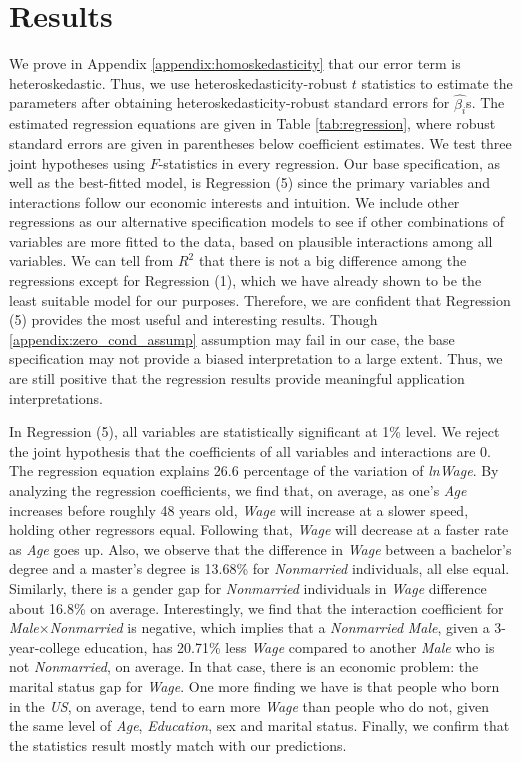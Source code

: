 \section{Results}
\label{sec:results}



We prove in Appendix \ref{appendix:homoskedasticity} that our error term is heteroskedastic. Thus, we use heteroskedasticity-robust $t$ statistics to estimate the parameters after obtaining heteroskedasticity-robust standard errors for $\hat{\beta_{i}}$s. The estimated regression equations are given in Table \ref{tab:regression}, where robust standard errors are given in parentheses below coefficient estimates. We test three joint hypotheses using $F$-statistics in every regression. Our base specification, as well as the best-fitted model, is Regression (5) since the primary variables and interactions follow our economic interests and intuition. We include other regressions as our alternative specification models to see if other combinations of variables are more fitted to the data, based on plausible interactions among all variables. We can tell from $R^2$ that there is not a big difference among the regressions except for Regression (1), which we have already shown to be the least suitable model for our purposes. Therefore, we are confident that Regression (5) provides the most useful and interesting results. Though \ref{appendix:zero_cond_assump} assumption may fail in our case, the base specification may not provide a biased interpretation to a large extent. Thus, we are still positive that the regression results provide meaningful application interpretations.

In Regression (5), all variables are statistically significant at 1\% level. We reject the joint hypothesis that the coefficients of all variables and interactions are 0. The regression equation explains 26.6 percentage of the variation of \textit{lnWage}. By analyzing the regression coefficients, we find that, on average, as one's \textit{Age} increases before roughly 48 years old, \textit{Wage} will increase at a slower speed, holding other regressors equal. Following that, \textit{Wage} will decrease at a faster rate as \textit{Age} goes up. Also, we observe that the difference in \textit{Wage} between a bachelor's degree and a master's degree is 13.68\% for \textit{Nonmarried} individuals, all else equal. Similarly, there is a gender gap for \textit{Nonmarried} individuals in \textit{Wage} difference about 16.8\% on average. Interestingly, we find that the interaction coefficient for \textit{Male$\times$Nonmarried} is negative, which implies that a \textit{Nonmarried} \textit{Male}, given a 3-year-college education, has 20.71\% less \textit{Wage} compared to another \textit{Male} who is not \textit{Nonmarried}, on average. In that case, there is an economic problem: the marital status gap for \textit{Wage}. One more finding we have is that people who born in the \textit{US}, on average, tend to earn more \textit{Wage} than people who do not, given the same level of \textit{Age}, \textit{Education}, sex and marital status. Finally, we confirm that the statistics result mostly match with our predictions.

